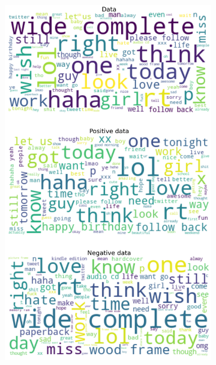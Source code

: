 \documentclass{article}
\begin{document}
\begin{itemize}
\begin{figure}[H]
\begin{subfigure}[b]{0.24\textwidth}
\includegraphics[width=\textwidth]{chapter-06/section-01-01/10/visualization/3/wordcloud.png}
\end{subfigure}
\begin{subfigure}[b]{0.24\textwidth}
\centering

\end{subfigure}
\end{figure}
\end{itemize}
\end{document}
